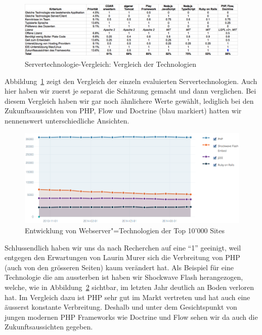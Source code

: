 			\begin{figure}[H]
				\begin{minipage}[b]{\linewidth}
					\includegraphics[width=\textwidth]{media/spreadsheets/ServertechnologieVergleichVergleichDerTechnologien.pdf}
					\centering
					\caption{Servertechnologie-Vergleich: Vergleich der Technologien}
					\label{fig:ServertechnologieVergleichVergleichDerTechnologien.pdf}
				\end{minipage}
			\end{figure}
			
			Abbildung~\ref{fig:ServertechnologieVergleichVergleichDerTechnologien.pdf} zeigt den Vergleich der einzeln evaluierten Servertechnologien.
			Auch hier haben wir zuerst je separat die Schätzung gemacht und dann verglichen.
			Bei diesem Vergleich haben wir gar noch ähnlichere Werte gewählt, lediglich bei den Zukunftsaussichten von PHP, Flow und Doctrine (blau markiert) hatten wir nennenswert unterschiedliche Ansichten.
			
			\begin{figure}
					\includegraphics[width=\textwidth]{media/img/EntwicklungVonWebserverTechnologien.png}
					\centering
					\caption{Entwicklung von Webserver"=Technologien der Top 10'000 Sites \cite{builtwith_pty_ltd_framework_2014}}
					\label{fig:EntwicklungVonWebserverTechnologien}
			\end{figure}
			
			Schlussendlich haben wir uns da nach Recherchen auf eine "`1"' geeinigt, weil entgegen den Erwartungen von Laurin Murer sich die Verbreitung von PHP (auch von den grösseren Seiten) kaum verändert hat.
			Als Beispiel für eine Technologie die am aussterben ist haben wir Shockwave Flash herangezogen, welche, wie in Abbildung~\ref{fig:EntwicklungVonWebserverTechnologien} sichtbar, im letzten Jahr deutlich an Boden verloren hat.
			Im Vergleich dazu ist PHP sehr gut im Markt vertreten und hat auch eine äusserst konstante Verbreitung.
			Deshalb und unter dem Gesichtspunkt von jungen modernen PHP Frameworks wie Doctrine und Flow sehen wir da auch die Zukunftsaussichten gegeben.
			
